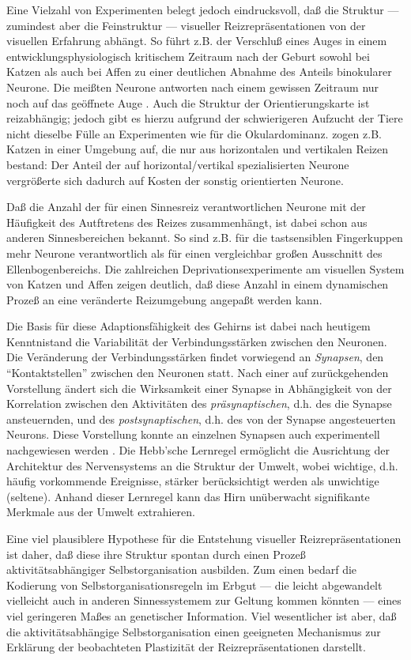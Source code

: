 Eine Vielzahl von Experimenten belegt jedoch eindrucksvoll, daß die
Struktur --- zumindest aber die Feinstruktur --- visueller
Reizrepräsentationen von der visuellen Erfahrung abhängt. So führt
z.B. der Verschluß eines Auges in einem entwicklungsphysiologisch
kritischem Zeitraum nach der Geburt sowohl bei Katzen als auch bei Affen zu
einer deutlichen Abnahme des Anteils binokularer Neurone. Die meißten
Neurone antworten nach einem gewissen Zeitraum nur noch auf das geöffnete
Auge . Auch die Struktur der
Orientierungskarte ist reizabhängig; jedoch gibt es hierzu aufgrund der
schwierigeren Aufzucht der Tiere nicht dieselbe Fülle an Experimenten wie
für die Okulardominanz.  zogen z.B. Katzen in
einer Umgebung auf, die nur aus horizontalen und vertikalen Reizen bestand:
Der Anteil der auf horizontal/vertikal spezialisierten Neurone
vergrößerte sich dadurch auf Kosten der sonstig orientierten Neurone.

Daß die Anzahl der für einen Sinnesreiz verantwortlichen Neurone mit der
Häufigkeit des Autftretens des Reizes zusammenhängt, ist dabei schon aus
anderen Sinnesbereichen bekannt.  So sind z.B. für die tastsensiblen
Fingerkuppen mehr Neurone verantwortlich als für einen vergleichbar
großen Ausschnitt des Ellenbogenbereichs. Die zahlreichen
Deprivationsexperimente am visuellen System von Katzen und Affen zeigen
deutlich, daß diese Anzahl in einem dynamischen Prozeß an eine
veränderte Reizumgebung angepaßt werden kann.

Die Basis für diese Adaptionsfähigkeit des Gehirns ist dabei nach
heutigem Kenntnistand die Variabilität der Verbindungsstärken zwischen
den Neuronen.  Die Veränderung der Verbindungsstärken findet vorwiegend
an \emph{Synapsen}, den ``Kontaktstellen'' zwischen den Neuronen statt.
Nach einer auf  zurückgehenden Vorstellung ändert
sich die Wirksamkeit einer Synapse in Abhängigkeit von der Korrelation
zwischen den Aktivitäten des \emph{präsynaptischen}, d.h. des die Synapse
ansteuernden, und des \emph{postsynaptischen}, d.h. des von der Synapse
angesteuerten Neurons. Diese Vorstellung konnte an einzelnen Synapsen auch
experimentell nachgewiesen werden \cite{brown:1990,kirkwood:1994}.  Die
Hebb'sche Lernregel ermöglicht die Ausrichtung der Architektur des
Nervensystems an die Struktur der Umwelt, wobei wichtige, d.h. häufig
vorkommende Ereignisse, stärker berücksichtigt werden als unwichtige
(seltene). Anhand dieser Lernregel kann das Hirn unüberwacht signifikante
Merkmale aus der Umwelt extrahieren.

Eine viel plausiblere Hypothese für die Entstehung visueller
Reizrepräsentationen ist daher, daß diese ihre Struktur spontan durch
einen Prozeß aktivitätsabhängiger Selbstorganisation ausbilden.  Zum
einen bedarf die Kodierung von Selbstorganisationsregeln im Erbgut --- die
leicht abgewandelt vielleicht auch in anderen Sinnessystemem zur Geltung
kommen könnten --- eines viel geringeren Maßes an genetischer
Information.  Viel wesentlicher ist aber, daß die aktivitätsabhängige
Selbstorganisation einen geeigneten Mechanismus zur Erklärung der
beobachteten Plastizität der Reizrepräsentationen darstellt.
